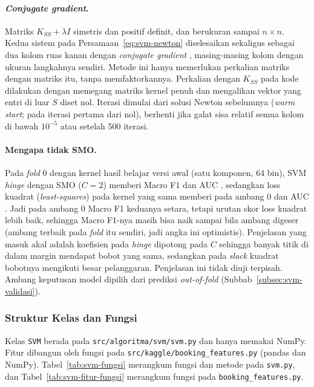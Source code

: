 \paragraph{\textit{Conjugate gradient}.} Matriks $K_{SS} + \lambda I$ simetris dan positif definit, dan berukuran sampai $n \times n$. Kedua sistem pada Persamaan~\eqref{eq:svm-newton} diselesaikan sekaligus sebagai dua kolom ruas kanan dengan \textit{conjugate gradient} \cite{hestenes1952cg}, masing-masing kolom dengan ukuran langkahnya sendiri. Metode ini hanya memerlukan perkalian matriks dengan matriks itu, tanpa memfaktorkannya. Perkalian dengan $K_{SS}$ pada kode dilakukan dengan memegang matriks kernel penuh dan mengalikan vektor yang entri di luar $S$ diset nol. Iterasi dimulai dari solusi Newton sebelumnya (\textit{warm start}; pada iterasi pertama dari nol), berhenti jika galat sisa relatif semua kolom di bawah $10^{-5}$ atau setelah 500 iterasi.

\paragraph{Mengapa tidak SMO.} Pada \textit{fold} 0 dengan kernel hasil belajar versi awal (satu komponen, 64 bin), SVM \textit{hinge} dengan SMO ($C = 2$) memberi Macro F1 \SVMHingeFoldF{} dan AUC \SVMHingeFoldAUC{}, sedangkan loss kuadrat (\textit{least-squares}) pada kernel yang sama memberi \SVMKuadratFoldF{} pada ambang 0 dan AUC \SVMKuadratFoldAUC{}. Jadi pada ambang 0 Macro F1 keduanya setara, tetapi urutan skor loss kuadrat lebih baik, sehingga Macro F1-nya masih bisa naik sampai \SVMKuadratFoldFTerbaik{} bila ambang digeser (ambang terbaik pada \textit{fold} itu sendiri, jadi angka ini optimistis). Penjelasan yang masuk akal adalah koefisien pada \textit{hinge} dipotong pada $C$ sehingga banyak titik di dalam margin mendapat bobot yang sama, sedangkan pada \textit{slack} kuadrat bobotnya mengikuti besar pelanggaran. Penjelasan ini tidak diuji terpisah. Ambang keputusan model dipilih dari prediksi \textit{out-of-fold} (Subbab~\ref{subsec:svm-validasi}).

\subsubsection{Struktur Kelas dan Fungsi}
Kelas \texttt{SVM} berada pada \nolinkurl{src/algoritma/svm/svm.py} dan hanya memakai NumPy. Fitur dibangun oleh fungsi pada \nolinkurl{src/kaggle/booking_features.py} (pandas dan NumPy). Tabel~\ref{tab:svm-fungsi} merangkum fungsi dan metode pada \texttt{svm.py}, dan Tabel~\ref{tab:svm-fitur-fungsi} merangkum fungsi pada \texttt{booking\_features.py}.

